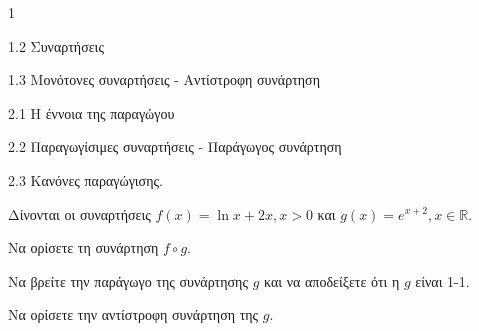 \begin{ylh}{1}
    \item 1.2 Συναρτήσεις
    \item 1.3 Μονότονες συναρτήσεις - Αντίστροφη συνάρτηση
    \item 2.1 Η έννοια της παραγώγου
    \item 2.2 Παραγωγίσιμες συναρτήσεις - Παράγωγος συνάρτηση
    \item 2.3 Κανόνες παραγώγισης.
\end{ylh}
Δίνονται οι συναρτήσεις $f(x) = \ln x + 2x, x > 0$ και $g(x) = e^{x+2}, x \in \mathbb{R}$.
\begin{alist}
\item Να ορίσετε τη συνάρτηση $f \circ g$. 
\item Να βρείτε την παράγωγο της συνάρτησης $g$ και να αποδείξετε ότι η $g$ είναι 1-1. 
\item Να ορίσετε την αντίστροφη συνάρτηση της $g$. 
\end{alist}